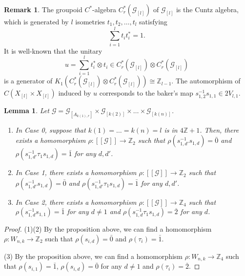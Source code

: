 \documentclass[11pt]{article}
\newtheorem{lemma}[theorem]{Lemma}
\theoremstyle{definition}
\newtheorem{remark}[theorem]{Remark}
\numberwithin{equation}{section}
\newcommand{\G}{\mathcal{G}}
\newcommand{\Z}{\mathbb{Z}}
\begin{document}
\begin{remark}
The groupoid $C^*$-algebra $C^*_r(\G_{[l]})$ of $\G_{[l]}$ is 
the Cuntz algebra, 
which is generated by $l$ isometries $t_1,t_2,\dots,t_l$ satisfying 
\[
\sum_{i=1}^lt_it_i^*=1. 
\]
It is well-known that the unitary 
\[
u=\sum_{i=1}^lt_i^*\otimes t_i\in C^*_r(\G_{[l]})\otimes C^*_r(\G_{[l]})
\]
is a generator of $K_1(C^*_r(\G_{[l]})\otimes C^*_r(\G_{[l]}))\cong\Z_{l-1}$. 
The automorphism of $C(X_{[l]}\times X_{[l]})$ induced by $u$ 
corresponds to the baker's map $s_{1,2}^{-1}s_{1,1}\in 2V_{l,1}$. 
\end{remark}


\begin{lemma}\label{tauisnonzero}
Let $\G=\G_{[A_{k(1),r}]}\times\G_{[k(2)]}\times\dots\times\G_{[k(n)]}$. 
\begin{enumerate}
\item In Case 0, suppose that $k(1)=\dots=k(n)=l$ is in $4\Z+1$. 
Then, there exists a homomorphism $\rho:[[\G]]\to\Z_2$ 
such that $\rho(s_{1,d'}^{-1}s_{1,d})=\bar{0}$ and 
$\rho(s_{1,d'}^{-1}\tau_1s_{1,d})=\bar{1}$ for any $d,d'$. 
\item In Case 1, 
there exists a homomorphism $\rho:[[\G]]\to\Z_2$ 
such that $\rho(s_{1,d'}^{-1}s_{1,d})=\bar{0}$ and 
$\rho(s_{1,d'}^{-1}\tau_1s_{1,d})=\bar{1}$ for any $d,d'$. 
\item In Case 2, 
there exists a homomorphism $\rho:[[\G]]\to\Z_4$ 
such that $\rho(s_{1,d}^{-1}s_{1,1})=\bar{1}$ for any $d\neq1$ and 
$\rho(s_{1,d}^{-1}\tau_1s_{1,d})=\overline{2}$ for any $d$. 
\end{enumerate}
\end{lemma}
\begin{proof}
(1)(2)
By the proposition above, 
we can find a homomorphism $\rho:W_{n,k}\to\Z_2$ 
such that $\rho(s_{i,d})=\bar{0}$ and $\rho(\tau_i)=\bar{1}$. 

(3)
By the proposition above, 
we can find a homomorphism $\rho:W_{n,k}\to\Z_4$ 
such that $\rho(s_{i,1})=\bar{1}$, $\rho(s_{i,d})=\bar{0}$ for any $d\neq1$ 
and $\rho(\tau_i)=\overline{2}$. 
\end{proof}
\end{document}
